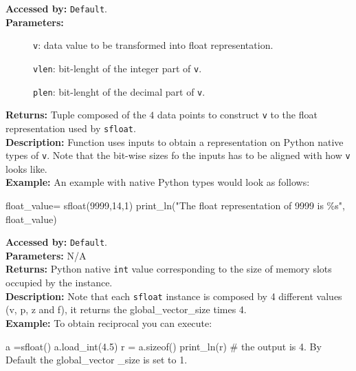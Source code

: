 		      \textbf{Accessed by:} \verb|Default|. \\
		      \textbf{Parameters:}
		      \begin{description}
			     \item[]\verb|v|: data value to be transformed into float representation.
			     \item[]\verb|vlen|: bit-lenght of the integer part of \verb|v|.
			     \item[]\verb|plen|: bit-lenght of the decimal part of \verb|v|.
		      \end{description}
		      \textbf{Returns:} Tuple composed of the $4$ data points to construct \verb|v| to the float representation used by \verb|sfloat|. \\
		      \textbf{Description:} Function uses inputs to obtain a representation on Python native types of \verb|v|. Note that the bit-wise sizes fo the inputs has to be aligned with how \verb|v| looks like.	 \\
		\textbf{Example:}
		An example with native Python types would look as follows:
		\begin{mylisting}
		   float_value= sfloat(9999,14,1) 
	 	   print_ln("The float representation of 9999 is \%s", float_value)		
		\end{mylisting}
                        \textbf{Accessed by:} \verb|Default|. \\
                        \textbf{Parameters:} N/A \\
                        \textbf{Returns:}
                                 Python native \verb|int| value corresponding to the size of memory slots occupied by the instance. \\
                        \textbf{Description:}
                                Note that each \verb|sfloat| instance is composed by 4 different values (v, p, z and f), it returns the global_vector_size times 4. \\
                \textbf{Example:}
                    To obtain reciprocal you can execute:
                        \begin{mylisting}
                                a =sfloat()
                                a.load_int(4.5)
                                r = a.sizeof()
                                print_ln(r)  # the output is 4. By Default the global_vector
                                _size is set to 1.
                        \end{mylisting}
		
